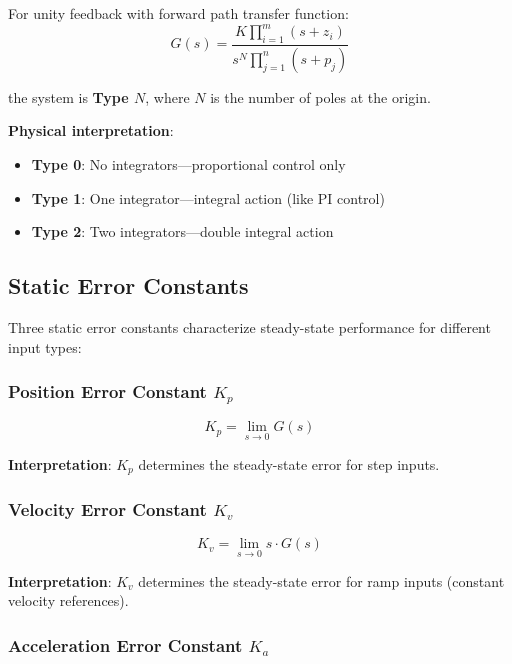 For unity feedback with forward path transfer function:
\begin{equation}
    G(s) = \frac{K \prod_{i=1}^{m}(s + z_i)}{s^N \prod_{j=1}^{n}(s + p_j)}
\end{equation}

the system is \textbf{Type $N$}, where $N$ is the number of poles at the origin.

\textbf{Physical interpretation}:
\begin{itemize}
    \item \textbf{Type 0}: No integrators---proportional control only
    \item \textbf{Type 1}: One integrator---integral action (like PI control)
    \item \textbf{Type 2}: Two integrators---double integral action
\end{itemize}

\subsection{Static Error Constants}

Three static error constants characterize steady-state performance for different input types:

\subsubsection{Position Error Constant $K_p$}

\begin{equation}
    K_p = \lim_{s \to 0} G(s)
\end{equation}

\textbf{Interpretation}: $K_p$ determines the steady-state error for step inputs.

\subsubsection{Velocity Error Constant $K_v$}

\begin{equation}
    K_v = \lim_{s \to 0} s \cdot G(s)
\end{equation}

\textbf{Interpretation}: $K_v$ determines the steady-state error for ramp inputs (constant velocity references).

\subsubsection{Acceleration Error Constant $K_a$}


